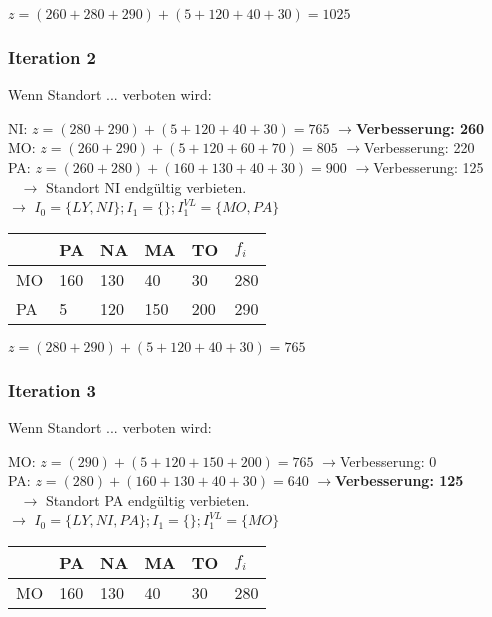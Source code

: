 \documentclass[a4paper,11pt]{article}
\begin{document}
$z = (260 + 280 + 290) + (5 + 120 + 40 + 30) = 1025$ \\

\subsubsection*{Iteration 2}
Wenn Standort ... verboten wird: \newline

NI: $z = (280 + 290) + (5 + 120 + 40 + 30) = 765$ $\to$\textbf{Verbesserung: 260} \\
MO: $z = (260 + 290) + (5 + 120 + 60 + 70) = 805$ $\to$Verbesserung: 220 \\
PA: $z = (260 + 280) + (160 + 130 + 40 + 30) = 900$ $\to$Verbesserung: 125 \\
~\newline
$\longrightarrow$ Standort NI endgültig verbieten. \\
$\longrightarrow$ $I_0 = \{LY, NI\}; I_1 = \{ \}; I_1^{VL} = \{MO, PA\}$
~\newline

\begin{tabular}{l|l|l|l|l|l}
    & PA & NA & MA & TO & $f_i$ \\ \hline
MO  & 160 & 130 & 40 & 30 & 280 \\ \hline
PA  & 5 & 120 & 150 & 200 & 290 \\ 
\end{tabular} \newline

$z = (280 + 290) + (5 + 120 + 40 + 30) = 765$ \\

\subsubsection*{Iteration 3}
Wenn Standort ... verboten wird: \newline

MO: $z = (290) + (5 + 120 + 150 + 200) = 765$ $\to$Verbesserung: 0 \\
PA: $z = (280) + (160 + 130 + 40 + 30) = 640$ $\to$\textbf{Verbesserung: 125} \\
~\newline
$\longrightarrow$ Standort PA endgültig verbieten. \\
$\longrightarrow$ $I_0 = \{LY, NI, PA\}; I_1 = \{ \}; I_1^{VL} = \{MO\}$
~\newline

\begin{tabular}{l|l|l|l|l|l}
    & PA & NA & MA & TO & $f_i$ \\ \hline
MO  & 160 & 130 & 40 & 30 & 280 \\
\end{tabular} \newline
\end{document}
